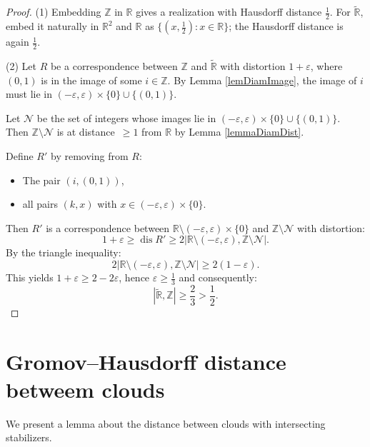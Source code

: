 \documentclass[leqno]{article}
\begin{document}
\begin{proof}
  (1) Embedding $\mathbb{Z}$ in $\mathbb{R}$ gives a realization with
  Hausdorff distance $\frac{1}{2}$. For $\widetilde{\mathbb{R}}$,
  embed it naturally in $\mathbb{R}^2$ and $\mathbb{R}$ as $\{(x,
  \frac{1}{2}) : x \in \mathbb{R}\}$; the Hausdorff distance is again
  $\frac{1}{2}$.

  (2) Let $R$ be a correspondence between $\mathbb{Z}$ and
  $\widetilde{\mathbb{R}}$ with distortion $1 + \varepsilon$, where
  $(0,1)$ is in the image of some $i \in \mathbb{Z}$. By Lemma
  \ref{lemDiamImage}, the image of $i$ must lie in $(-\varepsilon,
  \varepsilon) \times \{0\} \cup \{(0,1)\}$.

  Let $\mathcal{N}$ be the set of integers whose images lie in
  $(-\varepsilon, \varepsilon) \times \{0\} \cup \{(0,1)\}$. Then
  $\mathbb{Z} \setminus \mathcal{N}$ is at \mbox{distance $\geq 1$}
  from $\mathbb{R}$ by Lemma \ref{lemmaDiamDist}.

  Define $R'$ by removing from $R$:
  \begin{itemize}
    \item The pair $(i,(0,1))$,
    \item all pairs $(k,x)$ with $x \in (-\varepsilon, \varepsilon)
      \times \{0\}$.
  \end{itemize}

  Then $R'$ is a correspondence between
  $\mathbb{R}\setminus(-\varepsilon, \varepsilon) \times \{0\}$ and
  $\mathbb{Z} \setminus \mathcal{N}$ with distortion:
  $$
  1+\varepsilon \geq \operatorname{dis} R' \geq
  2\big|\mathbb{R}\setminus(-\varepsilon, \varepsilon), \mathbb{Z}
  \setminus \mathcal{N}\big|.
  $$
  By the triangle inequality:
  $$
  2\big|\mathbb{R}\setminus(-\varepsilon, \varepsilon), \mathbb{Z}
  \setminus \mathcal{N}\big| \geq 2(1 - \varepsilon).
  $$
  This yields $1+\varepsilon \geq 2-2\varepsilon$, hence $\varepsilon
  \geq \frac{1}{3}$ and consequently:
  $$
  |\widetilde{\mathbb{R}}, \mathbb{Z}| \geq \frac{2}{3} > \frac{1}{2}.
  $$
\end{proof}

\section{Gromov--Hausdorff distance betweem clouds}

We present a lemma about the distance between clouds with
intersecting stabilizers.
\end{document}
